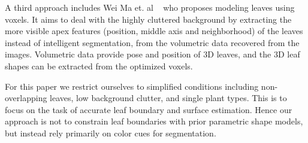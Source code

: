 A third approach includes Wei Ma et. al ~\cite{ma2008image} who proposes modeling leaves using voxels. It aims to deal with the highly cluttered background by extracting the more visible apex features (position, middle axis and neighborhood) of the leaves instead of intelligent segmentation, from the volumetric data recovered from the images.  Volumetric data provide pose and position of $3$D leaves, and the $3$D leaf shapes can be extracted from the optimized voxels.

For this paper we restrict ourselves to simplified conditions including non-overlapping leaves, low background clutter, and single plant types.  This is to focus on the task of accurate leaf boundary and surface estimation.  Hence our approach is not to constrain leaf boundaries with prior parametric shape models, but instead rely primarily on color cues for segmentation.






